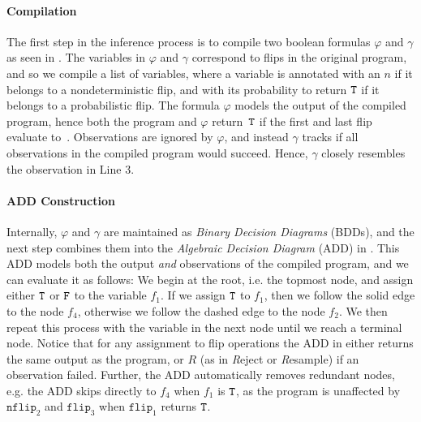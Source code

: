 \paragraph{Compilation} 
The first step in the inference process is to compile two boolean formulas $\varphi$ and $\gamma$ as seen in .
The variables in $\varphi$ and $\gamma$ correspond to flips in the original program, and so we compile a list of variables, where a variable is annotated with an $n$ if it belongs to a nondeterministic flip, and with its probability to return $\texttt{T}$ if it belongs to a probabilistic flip.
The formula $\varphi$ models the output of the compiled program, hence both the program and $\varphi$ return~$\texttt{T}$ if the first and last flip evaluate to~\TRUE.
Observations are ignored by $\varphi$, and instead $\gamma$ tracks if all observations in the compiled program would succeed.
Hence, $\gamma$ closely resembles the observation in Line 3.


\paragraph{ADD Construction}
Internally, $\varphi$ and $\gamma$ are maintained as \textit{Binary Decision Diagrams} (BDDs), and the next step combines them into the \textit{Algebraic Decision Diagram} (ADD) in .
This ADD models both the output \textit{and} observations of the compiled program, and we can evaluate it as follows:
We begin at the root, i.e. the topmost node, and assign either $\texttt{T}$ or $\texttt{F}$ to the variable $f_1$. 
If we assign $\texttt{T}$ to $f_1$, then we follow the solid edge to the node $f_4$, otherwise we follow the dashed edge to the node $f_2$.
We then repeat this process with the variable in the next node until we reach a terminal node. 
Notice that for any assignment to flip operations the ADD in  either returns the same output as the program, or $R$ (as in \emph{R}eject or \emph{R}esample) if an observation failed.
Further, the ADD automatically removes redundant nodes, e.g. the ADD skips directly to $f_4$ when $f_1$ is $\texttt{T}$, as the program is unaffected by $\texttt{nflip}_2$ and $\texttt{flip}_3$ when $\texttt{flip}_1$ returns $\texttt{T}$.


